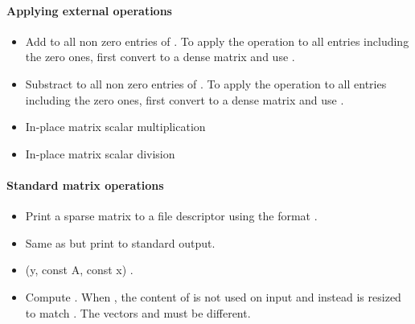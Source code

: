 \paragraph{Applying external operations}

\begin{itemize}
\item {}
  \sshortdescribe Add  to all non zero entries of . To apply the
  operation to all entries including the zero ones, first convert  to
  a dense matrix and use .
\item {}
  \sshortdescribe Substract  to all non zero entries of . To apply the
  operation to all entries including the zero ones, first convert  to
  a dense matrix and use .
\item {}
  \sshortdescribe In-place matrix scalar multiplication
\item {}
  \sshortdescribe In-place matrix scalar division
\end{itemize}


\paragraph{Standard matrix operations}

\begin{itemize}
\item {}
  \sshortdescribe Print a sparse matrix to a file descriptor using the format
  .
\item {}
  \sshortdescribe Same as  but print to standard
  output.
\item {}(\PnlVect \ptr y, const
  \PnlSpMat \ptr A, const \PnlVect \ptr x)
  \sshortdescribe {}.
\item {} 
  \sshortdescribe Compute . When , the
  content of  is not used on input and instead  is resized to
  match . The vectors  and  must be different.
\end{itemize}

